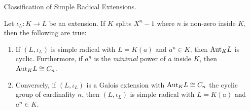 \documentclass[../book.tex]{subfiles}
\begin{document}
\begin{thm} Classification of Simple Radical Extensions.
    
    Let $\iota_L : K \to L$ be an extension. 
    If $K$ splits $X^n - 1$ where $n$ is non-zero inside $K$,
    then the following are true: \begin{enumerate}
        \item If $(L,\iota_L)$ is simple radical
        with $L = K(a)$ and $a^n \in K$,
        then $\mathrm{Aut}_{K}L$ is cyclic.
        Furthermore, if $a^n$ is the \emph{minimal} power of $a$ inside $K$,
        then $\mathrm{Aut}_{K}L \cong C_n$.
        \item Conversely, if $(L,\iota_L)$ is a Galois extension 
        with $\mathrm{Aut}_{K}L \cong C_n$ the cyclic group of cardinality $n$,
        then $(L,\iota_L)$ is simple radical with $L = K(a)$ and $a^n \in K$. 
    \end{enumerate}
    
\end{thm}
\end{document}
